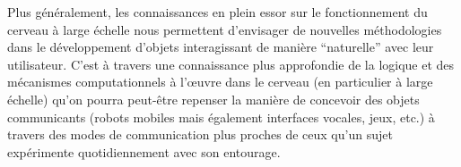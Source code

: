 \documentclass[11pt]{article}
\begin{document}
Plus généralement, les connaissances en plein essor sur le fonctionnement
du cerveau à large échelle nous permettent d'envisager de nouvelles méthodologies 
dans le développement d'objets interagissant de manière ``naturelle'' avec leur utilisateur.
C'est à travers une connaissance plus approfondie de la logique et des mécanismes
computationnels à l’œuvre dans le cerveau (en particulier à large
échelle)
qu'on pourra peut-être repenser la manière de concevoir des objets communicants (robots mobiles
mais également interfaces vocales, jeux, etc.) à travers des modes de communication
plus proches de ceux qu'un sujet expérimente quotidiennement avec son entourage.




\end{document}
